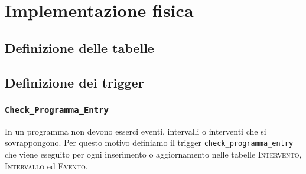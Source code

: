 \chapter{Implementazione fisica}

\section{Definizione delle tabelle}

\section{Definizione dei trigger}
\subsection{\texttt{Check\_Programma\_Entry}}
In un programma non devono esserci eventi, intervalli o interventi che si sovrappongono. Per questo motivo definiamo il trigger \texttt{check\_programma\_entry} che viene eseguito per ogni inserimento o aggiornamento nelle tabelle \textsc{Intervento}, \textsc{Intervallo} ed \textsc{Evento}.

